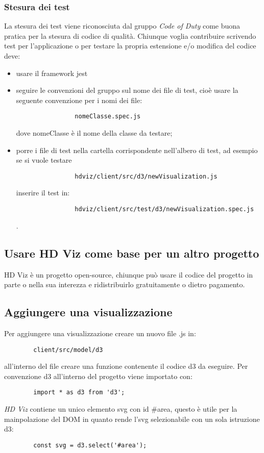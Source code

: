         \subsubsection{Stesura dei test}
        La stesura dei test viene riconosciuta dal gruppo \textit{Code of Duty} come buona pratica per la stesura di codice di qualità. Chiunque voglia contribuire scrivendo test per l'applicazione o per testare la propria estensione e/o modifica del codice deve:
        \begin{itemize}
            \item usare il framework jest
            \item seguire le convenzioni del gruppo sul nome dei file di test, cioè usare la seguente convenzione per i nomi dei file:
            \begin{verbatim}
                nomeClasse.spec.js
            \end{verbatim}
            dove nomeClasse è il nome della classe da testare;
            \item porre i file di test nella cartella corrispondente nell'albero di test, ad esempio se si vuole testare
            \begin{verbatim}
                hdviz/client/src/d3/newVisualization.js
            \end{verbatim}
            inserire il test in:
            \begin{verbatim}
                hdviz/client/src/test/d3/newVisualization.spec.js
            \end{verbatim}.
        \end{itemize}
    \subsection{Usare HD Viz come base per un altro progetto}
    HD Viz è un progetto open-source, chiunque può usare il codice del progetto in parte o nella sua interezza e ridistribuirlo gratuitamente o dietro pagamento.
    \subsection{Aggiungere una visualizzazione}
    Per aggiungere una visualizzazione creare un nuovo file .js in:
    \begin{verbatim}
        client/src/model/d3
    \end{verbatim}
    all'interno del file creare una funzione contenente il codice d3 da eseguire. Per convenzione d3 all'interno del progetto viene importato con:
    \begin{verbatim}
        import * as d3 from 'd3';
    \end{verbatim}
    \textit{HD Viz} contiene un unico elemento svg con id \#area, questo è utile per la mainpolazione del DOM in quanto rende l'svg selezionabile con un sola istruzione d3:
    \begin{verbatim}
        const svg = d3.select('#area');
    \end{verbatim}
